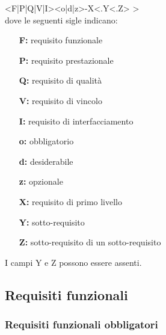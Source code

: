 {{<F|P|Q|V|I><o|d|z>-X<.Y<.Z> >\\

dove le seguenti sigle indicano:
\begin{itemize}
\item[\textbf{F:}] requisito funzionale
\item[\textbf{P:}] requisito prestazionale
\item[\textbf{Q:}] requisito di qualità
\item[\textbf{V:}] requisito di vincolo
\item[\textbf{I:}] requisito di interfacciamento\\
\end{itemize}
\begin{itemize}
\item[\textbf{o:}] obbligatorio
\item[\textbf{d:}] desiderabile
\item[\textbf{z:}] opzionale\\
\end{itemize}
\begin{itemize}
\item[\textbf{X:}] requisito di primo livello
\item[\textbf{Y:}] sotto-requisito
\item[\textbf{Z:}] sotto-requisito di un sotto-requisito\\
\end{itemize}
I campi Y e Z possono essere assenti.

\newpage

\subsection{Requisiti funzionali}

\subsubsection{Requisiti funzionali obbligatori}

}}

